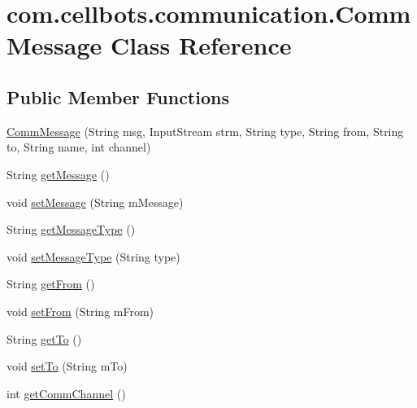 \hypertarget{classcom_1_1cellbots_1_1communication_1_1_comm_message}{\section{com.\-cellbots.\-communication.\-Comm\-Message Class Reference}
\label{classcom_1_1cellbots_1_1communication_1_1_comm_message}
}
\subsection*{Public Member Functions}
\begin{DoxyCompactItemize}
\item 
\hyperlink{classcom_1_1cellbots_1_1communication_1_1_comm_message_abbe57061d0fe25bcb8628bc42d52ab86}{Comm\-Message} (String msg, Input\-Stream strm, String type, String from, String to, String name, int channel)
\item 
String \hyperlink{classcom_1_1cellbots_1_1communication_1_1_comm_message_a48a1f953317fa74ac5fcf2a8b95345fa}{get\-Message} ()
\item 
void \hyperlink{classcom_1_1cellbots_1_1communication_1_1_comm_message_a7189a444a271ef7e5e6ddb3644ef1817}{set\-Message} (String m\-Message)
\item 
String \hyperlink{classcom_1_1cellbots_1_1communication_1_1_comm_message_a3dacd6473090cf33aef9fb7a1fed7b49}{get\-Message\-Type} ()
\item 
void \hyperlink{classcom_1_1cellbots_1_1communication_1_1_comm_message_a5ce2c11f21620e87ee2777bf764a1cb7}{set\-Message\-Type} (String type)
\item 
String \hyperlink{classcom_1_1cellbots_1_1communication_1_1_comm_message_a53d46d7aa1c4f93eb483b115286b3564}{get\-From} ()
\item 
void \hyperlink{classcom_1_1cellbots_1_1communication_1_1_comm_message_adb3ab313f7c3799bbeb14d5f435ba1a4}{set\-From} (String m\-From)
\item 
String \hyperlink{classcom_1_1cellbots_1_1communication_1_1_comm_message_ac43df09d418001edf42036c4875434f5}{get\-To} ()
\item 
void \hyperlink{classcom_1_1cellbots_1_1communication_1_1_comm_message_a791c4a33db7d24be0de153d0f85bb3f6}{set\-To} (String m\-To)
\item 
int \hyperlink{classcom_1_1cellbots_1_1communication_1_1_comm_message_aee012444b7d295f0a2d9c0303013e95d}{get\-Comm\-Channel} ()
\item 

\end{DoxyCompactItemize}
